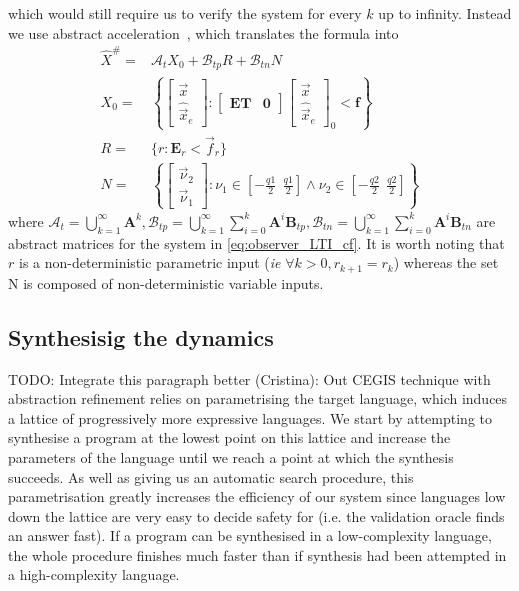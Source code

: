 \documentclass[runningheads,a4paper]{llncs}
\newcommand{\todo}[1]{{\color{red} TODO: #1}}
\newcommand{\mat}[1]{\boldsymbol{#1}}
\begin{document}
which would still require us to verify the system for every $k$ up to infinity. 
Instead we use abstract acceleration~\cite{cattaruzza2015unbounded}, which translates the formula into
%
\begin{align}
\label{eq:aa_observer_LTI_cf}
\hat{X}^\#
=&\mathcal{A}_t X_0+\mathcal{B}_{tp} R + \mathcal{B}_{tn} N\\
X_0 =&\left \{ \left[\begin{array}{c}\vec{x}\\ \hat{\vec{x}}_e \end{array}\right] :
 \left [\begin{array}{cc}\mat{E}\mat{T}&\mat{0}\end{array}\right] \left [\begin{array}{c}\vec{x}\\ \hat{\vec{x}}_e \end{array}\right]_0<\mat{f} \right\}\nonumber\\
 R =&\{r : \mat{E}_r < \vec{f}_r \}\nonumber\\
 N=&\left \{ \left[\begin{array}{c}\vec{\nu}_2\\ \vec{\nu}_1\end{array}\right] : \nu_1 \in \left[-\frac{q1}{2}\ \ \frac{q1}{2}\right] \wedge \nu_2 \in \left[-\frac{q2}{2}\ \ \frac{q2}{2}\right]  \right \}\nonumber
\end{align}
%
where $\mathcal{A}_t=\bigcup_{k=1}^\infty \mat{A}^k, \mathcal{B}_{tp}=\bigcup_{k=1}^\infty \sum_{i=0}^k\mat{A}^i\mat{B}_{tp}, \mathcal{B}_{tn}=\bigcup_{k=1}^\infty \sum_{i=0}^k\mat{A}^i\mat{B}_{tn}$ are abstract matrices for the system in \eqref{eq:observer_LTI_cf}. It is worth noting that $r$ is a non-deterministic parametric input (\emph{ie} $\forall k>0, r_{k+1} =r_k$) whereas the set N is composed of non-deterministic variable inputs.


\subsection{Synthesisig the dynamics}\label{sec:cof_synth}
\todo{Integrate this paragraph better (Cristina):}
Out CEGIS technique with abstraction refinement
relies on parametrising the target language, which
induces a lattice of progressively more expressive languages.  We
start by attempting to synthesise a program at the lowest point on
this lattice and increase the parameters of the language until we
reach a point at which the synthesis succeeds. As well as giving us an
automatic search procedure, this parametrisation greatly increases the
efficiency of our system since languages low down the lattice are very
easy to decide safety for (i.e. the validation oracle finds an answer
fast). If a program can be synthesised in a low-complexity language,
the whole procedure finishes much faster than if synthesis had been
attempted in a high-complexity language.
\end{document}
